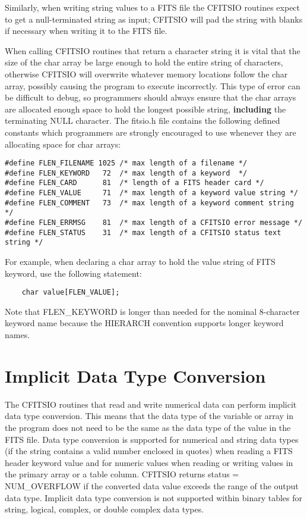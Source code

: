 \documentclass[11pt]{book}
\begin{document}
Similarly, when writing string values to a FITS file the
CFITSIO routines expect to get a null-terminated string as input;
CFITSIO will pad the string with blanks if necessary when writing it
to the FITS file.

When calling CFITSIO routines that return a character string it is
vital that the size of the char array be large enough to hold the
entire string of characters, otherwise CFITSIO will overwrite whatever
memory locations follow the char array, possibly causing the program to
execute incorrectly.  This type of error can be difficult to debug, so
programmers should always ensure that the char arrays are allocated
enough space to hold the longest possible string, {\bf including} the
terminating NULL character.  The fitsio.h file contains the following
defined constants which programmers are strongly encouraged to use
whenever they are allocating space for char arrays:

\begin{verbatim}
#define FLEN_FILENAME 1025 /* max length of a filename */
#define FLEN_KEYWORD   72  /* max length of a keyword  */
#define FLEN_CARD      81  /* length of a FITS header card */
#define FLEN_VALUE     71  /* max length of a keyword value string */
#define FLEN_COMMENT   73  /* max length of a keyword comment string */
#define FLEN_ERRMSG    81  /* max length of a CFITSIO error message */
#define FLEN_STATUS    31  /* max length of a CFITSIO status text string */
\end{verbatim}
For example, when declaring a char array to hold the value string
of FITS keyword, use the following statement:

\begin{verbatim}
    char value[FLEN_VALUE];
\end{verbatim}
Note that FLEN\_KEYWORD is longer than needed for the nominal 8-character
keyword name because the HIERARCH convention supports longer keyword names.


\section{Implicit Data Type Conversion}

The CFITSIO routines that read and write numerical data can perform
implicit data type conversion.  This means that the data type of the
variable or array in the program does not need to be the same as the
data type of the value in the FITS file.  Data type conversion is
supported for numerical and string data types (if the string contains a
valid number enclosed in quotes) when reading a FITS header keyword
value and for numeric values when reading or writing values in the
primary array or a table column.  CFITSIO returns status =
NUM\_OVERFLOW  if the converted data value exceeds the range of the
output data type.  Implicit data type conversion is not supported
within binary tables for string, logical, complex, or double complex
data types.
\end{document}
